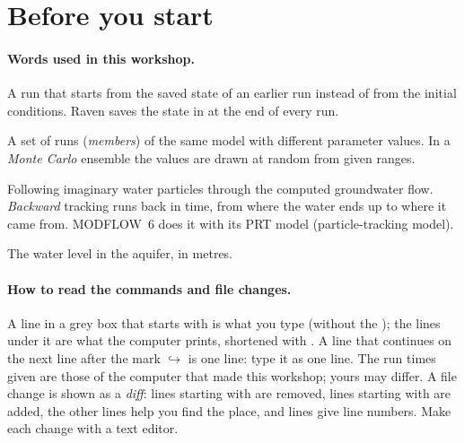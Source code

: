\section{Before you start}
\paragraph{Words used in this workshop.}
\begin{description}[itemsep=1pt]
\item[Hotstart] A run that starts from the saved state of an earlier run instead of from the initial conditions.
  Raven saves the state in  at the end of every run.
\item[Ensemble] A set of runs (\emph{members}) of the same model with different parameter values. In a \emph{Monte Carlo}
  ensemble the values are drawn at random from given ranges.
\item[Particle tracking] Following imaginary water particles through the computed groundwater flow. \emph{Backward}
  tracking runs back in time, from where the water ends up to where it came from. MODFLOW~6 does it with its PRT model
  (particle-tracking model).
\item[Head] The water level in the aquifer, in metres.
\end{description}

\paragraph{How to read the commands and file changes.} A line in a grey box that starts with \cmd{\$} is what you type
(without the \cmd{\$}); the lines under it are what the computer prints, shortened with . A line that continues on the next line after the mark $\hookrightarrow$ is one line: type it
as one line. The run times given are those of the computer that made this workshop; yours may differ. A file change is shown as
a \emph{diff}: lines starting with \cmd{-} are removed, lines starting with \cmd{+} are added, the other lines help you find
the place, and  lines give line numbers. Make each change with a text editor.
